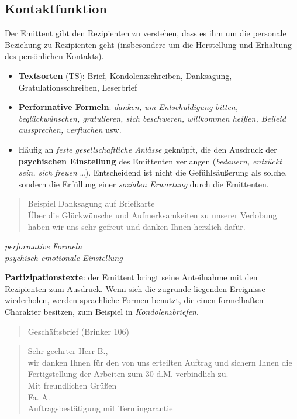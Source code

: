 \documentclass[
  letterpaper,
]{scrbook}
\begin{document}
\hypertarget{kontaktfunktion}{%
\subsection{Kontaktfunktion}\label{kontaktfunktion}}

Der Emittent gibt den Rezipienten zu verstehen, dass es ihm um die
personale Beziehung zu Rezipienten geht (insbesondere um die Herstellung
und Erhaltung des persönlichen Kontakts).

\begin{itemize}
\item
  \textbf{Textsorten} (TS): Brief, Kondolenzschreiben, Danksagung,
  Gratulationsschreiben, Leserbrief
\item
  \textbf{Performative Formeln}: \emph{danken, um Entschuldigung bitten,
  beglückwünschen, gratulieren, sich beschweren, willkommen heißen,
  Beileid aussprechen, verfluchen} usw.
\item
  Häufig an \emph{feste gesellschaftliche Anlässe} geknüpft, die den
  Ausdruck der \textbf{psychischen Einstellung} des Emittenten verlangen
  (\emph{bedauern, entzückt sein, sich freuen} \ldots). Entscheidend ist
  nicht die Gefühlsäußerung als solche, sondern die Erfüllung einer
  \emph{sozialen Erwartung} durch die Emittenten.
\end{itemize}

\begin{quote}
Beispiel Danksagung auf Briefkarte\\
Über die Glückwünsche und Aufmerksamkeiten zu unserer Verlobung haben
wir uns sehr gefreut und danken Ihnen herzlich dafür.
\end{quote}

\emph{performative Formeln}\\
\emph{psychisch-emotionale Einstellung}

\textbf{Partizipationstexte}: der Emittent bringt seine Anteilnahme mit
den Rezipienten zum Ausdruck. Wenn sich die zugrunde liegenden
Ereignisse wiederholen, werden sprachliche Formen benutzt, die einen
formelhaften Charakter besitzen, zum Beispiel in
\emph{Kondolenzbriefen}.

\begin{quote}
Geschäftsbrief (Brinker 106)
\end{quote}

\begin{quote}
Sehr geehrter Herr B.,\\
wir danken Ihnen für den von uns erteilten Auftrag und sichern Ihnen die
Fertigstellung der Arbeiten zum 30 d.M. verbindlich zu.\\
Mit freundlichen Grüßen\\
Fa. A.\\
Auftragsbestätigung mit Termingarantie\\
\end{quote}
\end{document}
